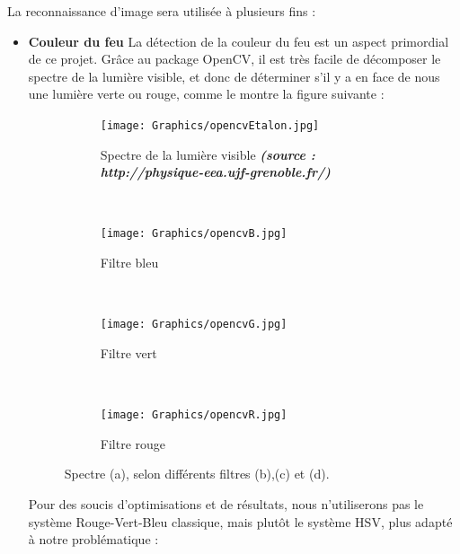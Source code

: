 			La reconnaissance d'image sera utilisée à plusieurs fins :
			\begin{itemize}
				\item \textbf{Couleur du feu}
					La détection de la couleur du feu est un aspect primordial de ce projet. Grâce au package OpenCV, il est très facile de décomposer le spectre de la lumière visible, et donc de déterminer s'il y a en face de nous une lumière verte ou rouge, comme le montre la figure suivante :
					\begin{figure}[H]
					    \centering
					    \begin{subfigure}[h]{0.5\textwidth}
					        \texttt{[image: Graphics/opencvEtalon.jpg]}
					        \caption{Spectre de la lumière visible \textit{\textbf{(source : http://physique-eea.ujf-grenoble.fr/)}}}
					    \end{subfigure}\\

					    \begin{subfigure}[h]{0.3\textwidth}
					        \texttt{[image: Graphics/opencvB.jpg]}
					        \caption{Filtre bleu}
					    \end{subfigure}
					    ~ %
					    \begin{subfigure}[h]{0.3\textwidth}
					        \texttt{[image: Graphics/opencvG.jpg]}
					        \caption{Filtre vert}
					    \end{subfigure}
					    ~ %
					    \begin{subfigure}[h]{0.3\textwidth}
					        \texttt{[image: Graphics/opencvR.jpg]}
					        \caption{Filtre rouge}
					    \end{subfigure}

					    \caption{Spectre (a), selon différents filtres (b),(c) et (d).}
					\end{figure}

					Pour des soucis d'optimisations et de résultats, nous n'utiliserons pas le système Rouge-Vert-Bleu classique, mais plutôt le système HSV\label{HSV}, plus adapté à notre problématique :


\end{itemize}
